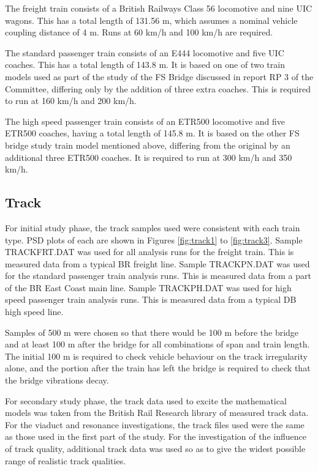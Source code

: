 \begin{appendices}
The freight train consists of a British Railways Class 56 locomotive and nine UIC wagons. This has a total length of 131.56 m, which assumes a nominal vehicle coupling distance of 4 m. Runs at 60 km/h and 100 km/h are required.

The standard passenger train consists of an E444 locomotive and five UIC coaches. This has a total length of 143.8 m. It is based on one of two train models used as part of the study of the FS Bridge discussed in report RP 3 of the Committee, differing only by the addition of three extra coaches. This is required to run at 160 km/h and 200 km/h.

The high speed passenger train consists of an ETR500 locomotive and five ETR500 coaches, having a total length of 145.8 m. It is based on the other FS bridge study train model mentioned above, differing from the original by an additional three ETR500 coaches. It is required to run at 300 km/h and 350 km/h.

\subsection{Track}

For initial study phase, the track samples used were consistent with each train type. PSD plots of each are shown in Figures \ref{fig:track1} to \ref{fig:track3}. Sample TRACKFRT.DAT was used for all analysis runs for the freight train. This is measured data from a typical BR freight line. Sample TRACKPN.DAT was used for the standard passenger train analysis runs. This is measured data from a part of the BR East Coast main line. Sample TRACKPH.DAT was used for high speed passenger train analysis runs. This is measured data from a typical DB high speed line.

Samples of 500 m were chosen so that there would be 100 m before the bridge and at least 100 m after the bridge for all combinations of span and train length. The initial 100 m is required to check vehicle behaviour on the track irregularity alone, and the portion after the train has left the bridge is required to check that the bridge vibrations decay.

For secondary study phase, the track data used to excite the mathematical models was taken from the British Rail Research library of measured track data. For the viaduct and resonance investigations, the track files used were the same as those used in the first part of the study. For the investigation of the influence of track quality, additional track data was used so as to give the widest possible range of realistic track qualities.


\end{appendices}
